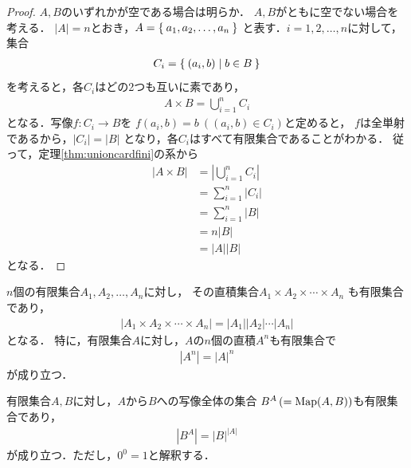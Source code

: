    \begin{proof}
     $A,B$のいずれかが空である場合は明らか．
     $A,B$がともに空でない場合を考える．
     $\lvert A \rvert = n$とおき，$A= \Set{ a_1, a_2, \ldots , a_n }$
     と表す．$i=1,2, \ldots , n$に対して，集合
     \begin{align*}
       C_i = \Set{ (a_i, b) \mid b \in B }
     \end{align*}
     を考えると，各$C_i$はどの2つも互いに素であり，
     \begin{align*}
       A \times B = \bigcup_{i=1}^{n} C_i
     \end{align*}
     となる．写像$f : C_i \longrightarrow B$を
     $f(a_i,b) = b \ ((a_i,b) \in C_i)$と定めると，
     $f$は全単射であるから，$\lvert C_i \rvert = \lvert B \rvert$
     となり，各$C_i$はすべて有限集合であることがわかる．
     従って，定理\ref{thm:unioncardfini}の系から
     \begin{align*}
       \lvert A \times B \rvert 
       & = \left \lvert \bigcup_{i=1}^{n} C_i \right \rvert \\
       & = \sum_{i=1}^{n} \lvert C_i \rvert \\
       & = \sum_{i=1}^{n} \lvert B \rvert \\
       & = n \lvert B \rvert \\
       & = \lvert A \rvert \lvert B \rvert 
     \end{align*}
     となる．
   \end{proof}

   \begin{coro}
     $n$個の有限集合$A_1,A_2, \ldots , A_n$に対し，
     その直積集合$A_1 \times A_2 \times \cdots \times A_n$
     も有限集合であり，
     \begin{align}
       \lvert A_1 \times A_2 \times \cdots \times A_n \rvert 
       = \lvert A_1 \rvert \lvert A_2 \rvert \cdots \lvert A_n \rvert
       \label{eq:tyokusekifiniipan}
     \end{align}
     となる．
     特に，有限集合$A$に対し，$A$の$n$個の直積$A^n$も有限集合で
     \begin{align}
       \left \lvert A^n \right \rvert = \lvert A \rvert ^n
       \label{eq:tyokunoudonko}
     \end{align}
     が成り立つ．
   \end{coro}
   
   \begin{thm} \label{thm:mapfini}
     有限集合$A, B$に対し，$A$から$B$への写像全体の集合
     $B^A \, (= \mathop{\mathrm{Map}}\limits (A,B) )$も有限集合であり，
     \begin{align}
       \left \lvert B^A \right \rvert = \lvert B \rvert ^{ \lvert A \rvert }
       \label{eq:mapfini}
     \end{align}
     が成り立つ．ただし，$0^0 = 1$と解釈する．
   \end{thm}

